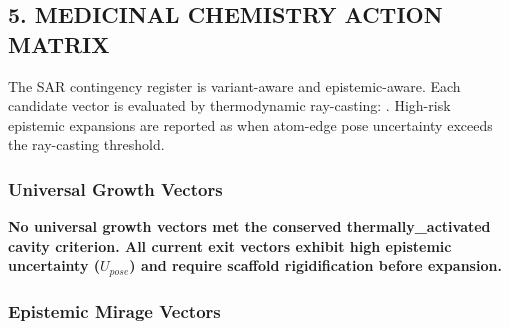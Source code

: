 \documentclass[11pt,a4paper]{article}
\begin{document}
\hypertarget{5-medicinal-chemistry-action-matrix}{%
\subsection{5. MEDICINAL CHEMISTRY ACTION MATRIX}\label{5-medicinal-chemistry-action-matrix}}

The SAR contingency register is variant-aware and epistemic-aware. Each candidate vector is
evaluated by thermodynamic ray-casting:
\texttt{}. High-risk
epistemic expansions are reported as \texttt{} when atom-edge pose
uncertainty exceeds the ray-casting threshold.

\hypertarget{universal-growth-vectors}{%
\subsubsection{Universal Growth Vectors}\label{universal-growth-vectors}}

\textbf{No universal growth vectors met the conserved thermally\_activated cavity criterion. All
current exit vectors exhibit high epistemic uncertainty (\(U_{pose}\)) and require scaffold
rigidification before expansion.}

\hypertarget{epistemic-mirage-vectors}{%
\subsubsection{Epistemic Mirage Vectors}\label{epistemic-mirage-vectors}}
\end{document}
